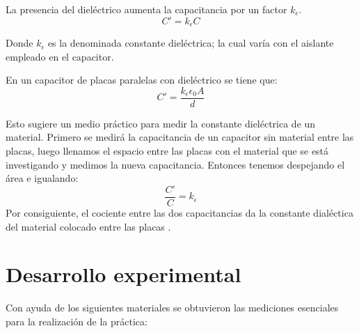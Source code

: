 \documentclass[letterpaper, 11 pt]{article}
\begin{document}
\begin{multicols}{2}
La presencia del dieléctrico aumenta la capacitancia por un factor $k_\epsilon$. 
\begin{equation}
C'=k_\epsilon C
\end{equation}

Donde $k_\epsilon$ es la denominada constante dieléctrica; la cual varía con el aislante empleado en el capacitor.

En un capacitor de placas paralelas con dieléctrico se tiene que:
\begin{equation}
C'=\frac{k_{\epsilon}\epsilon_{0}A}{d}
\end{equation}




Esto sugiere un medio práctico para medir la constante dieléctrica de un material. Primero se medirá la capacitancia de un capacitor sin material entre las placas, %
luego llenamos el espacio entre las placas con el material que se está investigando y medimos la nueva capacitancia. Entonces tenemos despejando el área e igualando:
$$
\frac{C'}{C}=k_\epsilon
$$
Por consiguiente, el cociente entre las dos capacitancias da la constante dialéctica del material colocado entre las placas \cite{finn1999}.

\section{Desarrollo experimental}

Con ayuda de los siguientes materiales se obtuvieron las mediciones esenciales para la realización de la práctica:


\end{multicols}
\end{document}
